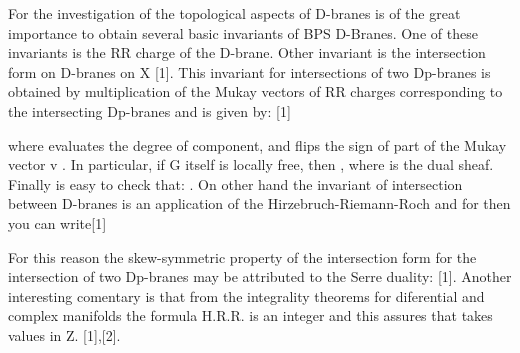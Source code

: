\documentclass[a4paper,a4paper]{article}
\begin{document}
For the investigation of the topological aspects of D-branes is of the great importance to obtain several basic invariants of BPS D-Branes. One of these invariants is the RR charge of the D-brane. Other invariant is the intersection form on D-branes on X [1]. This invariant for intersections of 
two Dp-branes is obtained by multiplication of the Mukay vectors of RR charges corresponding to the intersecting Dp-branes and is given by: [1]
 
\begin{center}
\setlength{\baselineskip}{30pt}
{  \coordHE{} }
\end{center}
where \coordHE{}  evaluates the degree of \coordHE{} component, and \coordHE{} flips the sign of \coordHE{} part of the Mukay vector v . In particular, if G itself is locally free, then \coordHE{}, where  \coordHE{} is the dual sheaf. Finally is easy to check that: \coordHE{}.
On other hand the invariant of intersection between D-branes is an application of the Hirzebruch-Riemann-Roch and for then you can write[1]
\begin{center}

{  \coordHE{} }
\end{center}
For this reason the skew-symmetric property \coordHE{} of the intersection form \coordHE{}  for the intersection of two Dp-branes may be attributed to the Serre duality: \coordHE{} [1]. Another interesting comentary is that from the integrality theorems for diferential and complex manifolds the formula H.R.R. is an integer and this assures that
\coordHE{} takes values in Z. [1],[2].
 
\end{document}
